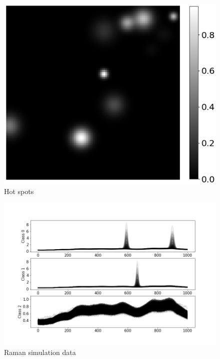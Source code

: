 \documentclass{article}
\begin{document}
\begin{figure}[H]
    \centering
\includegraphics[width=0.5\linewidth]{figures_3/raman_sim_hotspots.png}  
\caption{Hot spots}
\label{fig:hotspots}
\end{figure}


\begin{figure}[H]
	\centering
	\includegraphics[width=1\linewidth]{raman_sim_training_data_2.png}  
	\caption{Raman simulation data}
	\label{fig:raman}
\end{figure}
\end{document}
